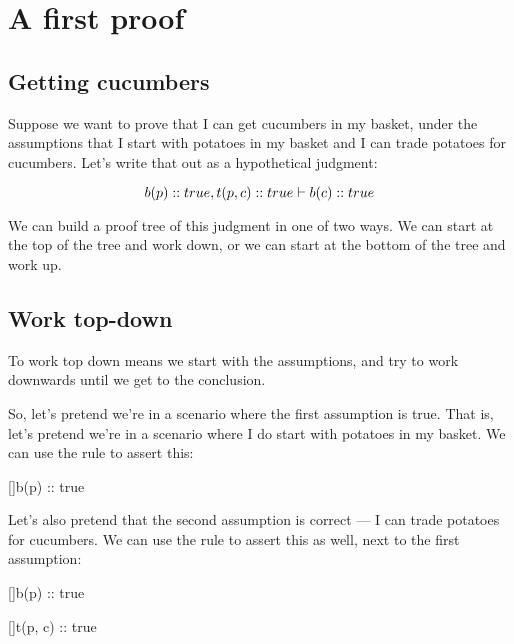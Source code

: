\documentclass[../../../main.tex]{subfiles}
\begin{document}
\chapter{A first proof}


\section{Getting cucumbers}

Suppose we want to prove that I can get cucumbers in my basket, under the assumptions that I start with potatoes in my basket and I can trade potatoes for cucumbers. Let's write that out as a hypothetical judgment:

\begin{equation*}
  b(p) :: true, t(p, c) :: true \ndturnstile/ b(c) :: true
\end{equation*}

\noindent
We can build a proof tree of this judgment in one of two ways. We can start at the top of the tree and work down, or we can start at the bottom of the tree and work up.


\section{Work top-down}

To work top down means we start with the assumptions, and try to work downwards until we get to the conclusion.

So, let's pretend we're in a scenario where the first assumption is true. That is, let's pretend we're in a scenario where I do start with potatoes in my basket. We can use the  rule to assert this:

\begin{prooftree*}
  \hypo{}
  []{b(p) :: true}
\end{prooftree*}

\noindent
Let's also pretend that the second assumption is correct --- I can trade potatoes for cucumbers. We can use the  rule to assert this as well, next to the first assumption:

\begin{prooftree*}
  \hypo{}
  []{b(p) :: true}
  
  \hypo{}
  []{t(p, c) :: true}
  
\end{prooftree*}
\end{document}
